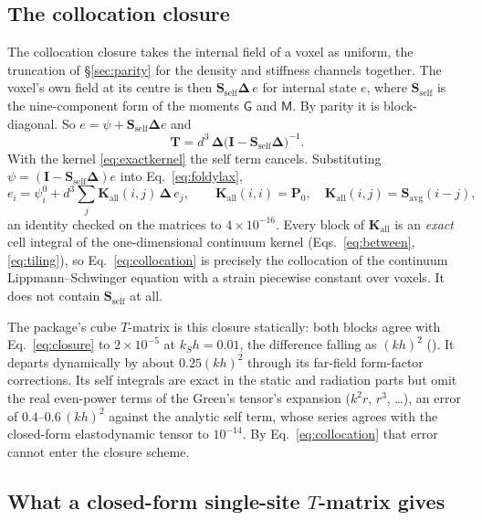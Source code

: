 \documentclass[preprint,review,12pt]{elsarticle}
\newcommand{\bI}{\mathbf{I}}
\newcommand{\bS}{\mathbf{S}}
\newcommand{\bT}{\mathbf{T}}
\newcommand{\bK}{\mathbf{K}}
\newcommand{\bP}{\mathbf{P}}
\newcommand{\bD}{\boldsymbol{\Delta}}
\begin{document}
\subsection{The collocation closure}\label{sec:closure}

The collocation closure takes the internal field of a voxel as uniform, the truncation of
\S\ref{sec:parity} for the density and stiffness channels together. The voxel's own field at its
centre is then $\bS_{\text{self}}\bD\,e$ for internal state $e$, where $\bS_{\text{self}}$ is the
nine-component form of the moments $\mathsf G$ and $\mathsf M$. By parity it is block-diagonal. So
$e=\psi+\bS_{\text{self}}\bD e$ and
\begin{equation}\label{eq:closure}
  \bT=d^3\,\bD\bigl(\bI-\bS_{\text{self}}\bD\bigr)^{-1}.
\end{equation}
With the kernel \eqref{eq:exactkernel} the self term cancels. Substituting
$\psi=(\bI-\bS_{\text{self}}\bD)e$ into Eq.~\eqref{eq:foldylax},
\begin{equation}\label{eq:collocation}
  e_i=\psi^0_i+d^3\sum_j \bK_{\text{all}}(i,j)\,\bD\,e_j,
  \qquad
  \bK_{\text{all}}(i,i)=\bP_0,\quad \bK_{\text{all}}(i,j)=\bS_{\text{avg}}(i-j),
\end{equation}
an identity checked on the matrices to $4\times10^{-16}$. Every block of $\bK_{\text{all}}$ is an
\emph{exact} cell integral of the one-dimensional continuum kernel (Eqs.~\eqref{eq:between},
\eqref{eq:tiling}), so Eq.~\eqref{eq:collocation} is precisely the collocation of the continuum
Lippmann--Schwinger equation with a strain piecewise constant over voxels. It does not contain
$\bS_{\text{self}}$ at all.

The package's cube $T$-matrix is this closure statically: both blocks agree with
Eq.~\eqref{eq:closure} to $2\times10^{-5}$ at $k_Sh=0.01$, the difference falling
as $(kh)^2$ (). It departs dynamically by about $0.25(kh)^2$ through its
far-field form-factor corrections. Its self integrals are exact in the static and radiation parts
but omit the real even-power terms of the Green's tensor's expansion ($k^2r$, $r^3$, \dots), an
error of $0.4$--$0.6\,(kh)^2$ against the analytic self term, whose series agrees with the
closed-form elastodynamic tensor to $10^{-14}$. By Eq.~\eqref{eq:collocation} that error cannot enter
the closure scheme.

\subsection{What a closed-form single-site $T$-matrix gives}\label{sec:whyclosed}
\end{document}
